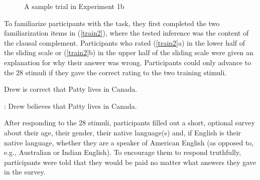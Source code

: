 \documentclass[11pt,fleqn]{article}
\newcommand{\6}{\mbox{$[\hspace*{-.6mm}[$}}
\newcommand{\9}{\mbox{$]\hspace*{-.6mm}]$}}
\begin{document}
\begin{figure}[h!]
\begin{center}
\end{center}
\caption{A sample trial in Experiment 1b}\label{f-trial-exp3}
\end{figure}

To familiarize participants with the task, they first completed the two familiarization items in (\ref{train2}), where the tested inference was the content of the clausal complement. Participants who rated (\ref{train2}a) in the lower half of the sliding scale or (\ref{train2}b) in the upper half of the sliding scale were given an explanation for why their answer was wrong. Participants could only advance to the 28 stimuli if they gave the correct rating to the two training stimuli.

\begin{exe}
\ex\label{train2}
\begin{xlist}
 Drew is correct that Patty lives in Canada. 

: Drew believes that Patty lives in Canada.
\end{xlist}
\end{exe}

After responding to the 28 stimuli, participants filled out a short, optional survey about their age, their gender, their native language(s) and, if English is their native language, whether they are a speaker of American English (as opposed to, e.g., Australian or Indian English). To encourage them to respond truthfully, participants were told that they would be paid no matter what answers they gave in the survey.
\end{document}
